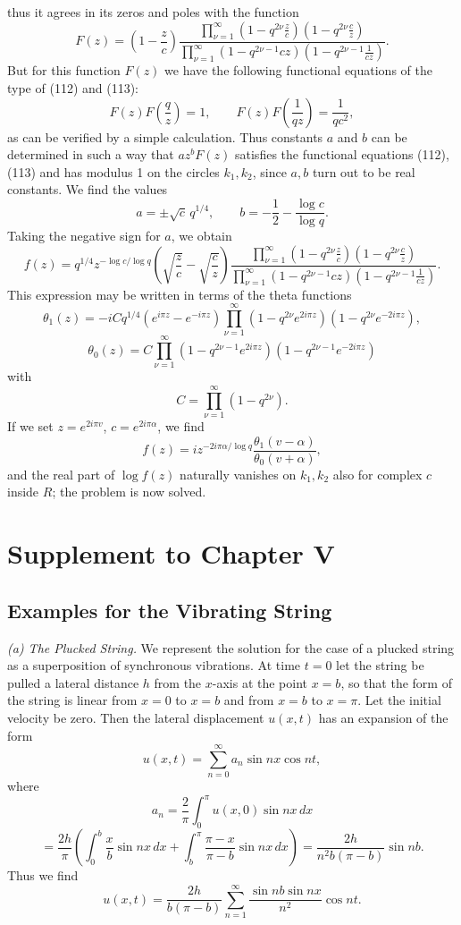 thus it agrees in its zeros and poles with the function
\[
F(z)=\left(1-\frac zc\right)
\frac{\displaystyle\prod_{\nu=1}^{\infty}\left(1-q^{2\nu}\frac zc\right)\left(1-q^{2\nu}\frac cz\right)}{\displaystyle\prod_{\nu=1}^{\infty}(1-q^{2\nu-1}cz)\left(1-q^{2\nu-1}\frac1{cz}\right)}.
\]
But for this function $F(z)$ we have the following functional equations of the type of (112) and (113):
\[
F(z)F\left(\frac qz\right)=1,
\qquad
F(z)F\left(\frac1{qz}\right)=\frac1{qc^2},
\]
as can be verified by a simple calculation. Thus constants $a$ and $b$ can be determined in such a way that $az^bF(z)$ satisfies the functional equations (112), (113) and has modulus 1 on the circles $k_1,k_2$, since $a,b$ turn out to be real constants. We find the values
\[
a=\pm\sqrt c\,q^{1/4},\qquad b=-\frac12-\frac{\log c}{\log q}.
\]
Taking the negative sign for $a$, we obtain
\[
f(z)=q^{1/4}z^{-\log c/\log q}\left(\sqrt{\frac zc}-\sqrt{\frac cz}\right)
\frac{\displaystyle\prod_{\nu=1}^{\infty}\left(1-q^{2\nu}\frac zc\right)\left(1-q^{2\nu}\frac cz\right)}{\displaystyle\prod_{\nu=1}^{\infty}(1-q^{2\nu-1}cz)\left(1-q^{2\nu-1}\frac1{cz}\right)}.
\]
This expression may be written in terms of the theta functions
\[
\theta_1(z)=-iCq^{1/4}(e^{i\pi z}-e^{-i\pi z})\prod_{\nu=1}^{\infty}(1-q^{2\nu}e^{2i\pi z})(1-q^{2\nu}e^{-2i\pi z}),
\]
\[
\theta_0(z)=C\prod_{\nu=1}^{\infty}(1-q^{2\nu-1}e^{2i\pi z})(1-q^{2\nu-1}e^{-2i\pi z})
\]
with
\[
C=\prod_{\nu=1}^{\infty}(1-q^{2\nu}).
\]
If we set $z=e^{2i\pi v}$, $c=e^{2i\pi\alpha}$, we find
\[
f(z)=iz^{-2i\pi\alpha/\log q}\frac{\theta_1(v-\alpha)}{\theta_0(v+\alpha)},
\]
and the real part of $\log f(z)$ naturally vanishes on $k_1,k_2$ also for complex $c$ inside $R$; the problem is now solved.

\section{Supplement to Chapter V}
\subsection{Examples for the Vibrating String}
\textit{(a) The Plucked String.} We represent the solution for the case of a plucked string as a superposition of synchronous vibrations. At time $t=0$ let the string be pulled a lateral distance $h$ from the $x$-axis at the point $x=b$, so that the form of the string is linear from $x=0$ to $x=b$ and from $x=b$ to $x=\pi$. Let the initial velocity be zero. Then the lateral displacement $u(x,t)$ has an expansion of the form
\[
u(x,t)=\sum_{n=0}^{\infty}a_n\sin nx\cos nt,
\]
where
\[
a_n=\frac2\pi\int_0^{\pi}u(x,0)\sin nx\,dx
\]
\[
=\frac{2h}{\pi}\left(\int_0^b\frac xb\sin nx\,dx+\int_b^{\pi}\frac{\pi-x}{\pi-b}\sin nx\,dx\right)
=\frac{2h}{n^2b(\pi-b)}\sin nb.
\]
Thus we find
\[
u(x,t)=\frac{2h}{b(\pi-b)}\sum_{n=1}^{\infty}\frac{\sin nb\sin nx}{n^2}\cos nt.
\]

